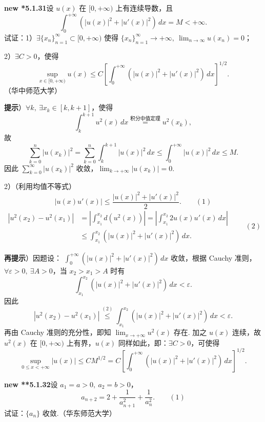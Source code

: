 \documentclass[UTF8, 12pt, fontset=fandol, oneside]{ctexart}
\begin{document}
\noindent\textbf{new *5.1.31}\quad 设 $u(x)$ 在 $[0,+\infty)$ 上有连续导数，且
\[
  \int_0^{+\infty}\left(|u(x)|^2+|u'(x)|^2\right)\,dx=M<+\infty.
\]
试证：1）$\exists\{x_n\}_{n=1}^{\infty}\subset[0,+\infty)$ 使得
$\{x_n\}_{n=1}^{\infty}\to+\infty,\ \lim_{n\to\infty}u(x_n)=0$；

2）$\exists C>0$，使得
\[
  \sup_{x\in[0,+\infty)}u(x)\le C\left[\int_0^{+\infty}\left(|u(x)|^2+|u'(x)|^2\right)\,dx\right]^{1/2}.
\]
（华中师范大学）

\noindent\textbf{提示}）$\forall k,\ \exists x_k\in[k,k+1]$，使得
\[
  \int_k^{k+1}u^2(x)\,dx
  \stackrel{\text{积分中值定理}}{=}u^2(x_k),
\]
故
\[
  \sum_{k=0}^n|u(x_k)|^2
  =\sum_{k=0}^n\int_k^{k+1}|u(x)|^2\,dx
  \le\int_0^{+\infty}|u(x)|^2\,dx\le M.
\]
因此 $\sum_{k=0}^{\infty}|u(x_k)|^2$ 收敛，$\lim_{k\to+\infty}|u(x_k)|=0$.

2）（利用均值不等式）
\[
  |u(x)u'(x)|\le\frac{|u(x)|^2+|u'(x)|^2}{2}.
\qquad(1)
\]
\begin{equation}
\begin{aligned}
|u^2(x_2)-u^2(x_1)|
&=\left|\int_{x_1}^{x_2}d(u^2(x))\right|
 =\left|\int_{x_1}^{x_2}2u(x)u'(x)\,dx\right|\\
&\le\int_{x_1}^{x_2}\left(|u(x)|^2+|u'(x)|^2\right)\,dx.
\end{aligned}
\qquad(2)
\end{equation}

\noindent\textbf{再提示}）因题设：
$\displaystyle\int_0^{+\infty}\left(|u(x)|^2+|u'(x)|^2\right)\,dx$ 收敛，根据 Cauchy 准则，
$\forall\varepsilon>0,\ \exists A>0$，当 $x_2>x_1>A$ 时有
\[
  \int_{x_1}^{x_2}\left(|u(x)|^2+|u'(x)|^2\right)\,dx<\varepsilon.
\]
因此
\[
  |u^2(x_2)-u^2(x_1)|\stackrel{(2)}{\le}
  \int_{x_1}^{x_2}\left(|u(x)|^2+|u'(x)|^2\right)\,dx<\varepsilon.
\]
再由 Cauchy 准则的充分性，即知 $\lim_{x\to+\infty}u^2(x)$ 存在. 加之 $u(x)$ 连续，故
$u^2(x)$ 在 $[0,+\infty)$ 上有界，$u(x)$ 同样如此，即：$\exists C>0$，可使得
\[
  \sup_{0\le x<+\infty}|u(x)|
  \le C M^{1/2}
  =C\left[\int_0^{+\infty}\left(|u(x)|^2+|u'(x)|^2\right)\,dx\right]^{1/2}.
\]

\noindent\textbf{new **5.1.32}\quad 设 $a_1=a>0,\ a_2=b>0$，
\[
  a_{n+2}=2+\frac1{a_{n+1}^2}+\frac1{a_n^2}.
\qquad(1)
\]
试证：$\{a_n\}$ 收敛.（华东师范大学）
\end{document}
